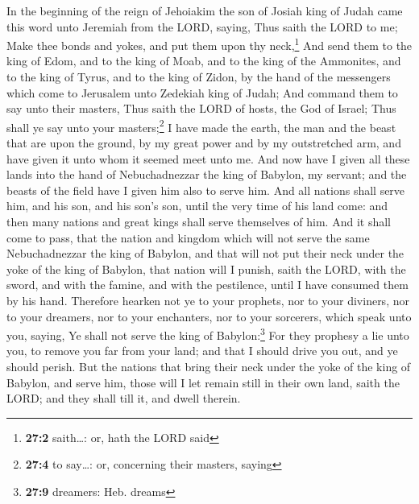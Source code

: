  In the beginning of the reign of Jehoiakim the son of
Josiah king of Judah came this word unto Jeremiah from the LORD, saying,
 Thus saith the LORD to me; Make thee bonds and yokes, and
put them upon thy neck,\footnote{\textbf{27:2} saith\ldots: or, hath the
  LORD said}  And send them to the king of Edom, and to
the king of Moab, and to the king of the Ammonites, and to the king of
Tyrus, and to the king of Zidon, by the hand of the messengers which
come to Jerusalem unto Zedekiah king of Judah;  And
command them to say unto their masters, Thus saith the LORD of hosts,
the God of Israel; Thus shall ye say unto your masters;\footnote{\textbf{27:4}
  to say\ldots: or, concerning their masters, saying}  I
have made the earth, the man and the beast that are upon the ground, by
my great power and by my outstretched arm, and have given it unto whom
it seemed meet unto me.  And now have I given all these
lands into the hand of Nebuchadnezzar the king of Babylon, my servant;
and the beasts of the field have I given him also to serve him.
 And all nations shall serve him, and his son, and his
son's son, until the very time of his land come: and then many nations
and great kings shall serve themselves of him.  And it
shall come to pass, that the nation and kingdom which will not serve the
same Nebuchadnezzar the king of Babylon, and that will not put their
neck under the yoke of the king of Babylon, that nation will I punish,
saith the LORD, with the sword, and with the famine, and with the
pestilence, until I have consumed them by his hand. 
Therefore hearken not ye to your prophets, nor to your diviners, nor to
your dreamers, nor to your enchanters, nor to your sorcerers, which
speak unto you, saying, Ye shall not serve the king of
Babylon:\footnote{\textbf{27:9} dreamers: Heb. dreams} 
For they prophesy a lie unto you, to remove you far from your land; and
that I should drive you out, and ye should perish.  But
the nations that bring their neck under the yoke of the king of Babylon,
and serve him, those will I let remain still in their own land, saith
the LORD; and they shall till it, and dwell therein.

